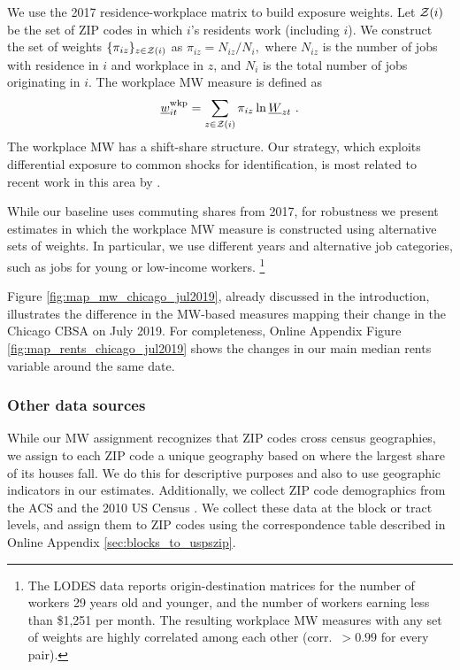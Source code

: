 We use the 2017 residence-workplace matrix to build exposure weights.
Let $\mathcal{Z}(i)$ be the set of ZIP codes in which $i$'s residents work 
(including $i$).
We construct the set of weights $\{\pi_{iz}\}_{z\in\mathcal{Z}(i)}$ as 
$ \pi_{iz} = N_{iz}/{N_i} , $
where 
$N_{iz}$ is the number of jobs with residence in $i$ and workplace in $z$, 
and $N_i$ is the total number of jobs originating in $i$.
The workplace MW measure is defined as
\begin{equation*}\label{eq:mw_wkp_def}
    \mw^{\wkp}_{it} = \sum_{z\in\Z(i)} \pi_{iz} \ln \MW_{zt} \ .
\end{equation*}
The workplace MW has a shift-share structure.
Our strategy, which exploits differential exposure to common shocks for 
identification, is most related to recent work in this area by 
\textcite{GoldsmithpinkhamEtAl2020}.

While our baseline uses commuting shares from 2017,
for robustness we present estimates in which the workplace MW measure
is constructed using alternative sets of weights.
In particular, we use different years and alternative job categories,
such as jobs for young or low-income workers.%
\footnote{The LODES data reports origin-destination matrices for the number of 
    workers 29 years old and younger, and the number of workers earning less 
    than \$1,251 per month.
The resulting workplace MW measures with any set of weights are highly correlated 
among each other (corr.\ $>0.99$ for every pair).}

Figure \ref{fig:map_mw_chicago_jul2019}, already discussed in the introduction,
illustrates the difference in the MW-based measures mapping their change in the 
Chicago CBSA on July 2019.
For completeness, Online Appendix Figure \ref{fig:map_rents_chicago_jul2019} 
shows the changes in our main median rents variable around the same date.


\subsubsection{Other data sources}\label{sec:data_other}

While our MW assignment recognizes that ZIP codes cross census geographies, 
we assign to each ZIP code a unique geography based on where the largest 
share of its houses fall.
We do this for descriptive purposes and also to use geographic indicators  
in our estimates.
Additionally, we collect ZIP code demographics from the ACS 
\parencite{CensusACS} and the 2010 US Census \parencite{CensusDecennial}.
We collect these data at the block or tract levels, and assign them to ZIP codes
using the correspondence table described in Online Appendix 
\ref{sec:blocks_to_uspszip}.

